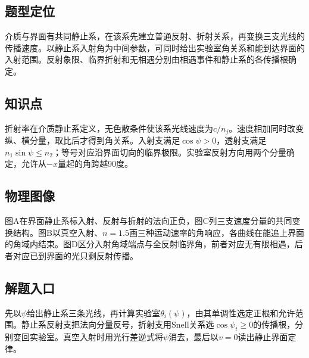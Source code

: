 \documentclass[UTF8,fontset=fandol,a4paper,11pt]{ctexart}
\begin{document}


\subsection*{题型定位}

介质与界面有共同静止系，在该系先建立普通反射、折射关系，再变换三支光线的传播速度。以静止系入射角为中间参数，可同时给出实验室角关系和能到达界面的入射范围。反射象限、临界折射和无相遇分别由相遇事件和静止系的各传播根确定。



\subsection*{知识点}

折射率在介质静止系定义，无色散条件使该系光线速度为$c/n_j$。速度相加同时改变纵、横分量，取比后才得到角关系。入射支满足$\cos\psi>0$，透射支满足$n_1\sin\psi\le n_2$；等号对应沿界面切向的临界极限。实验室反射方向用两个分量确定，允许从$-x$量起的角跨越90度。



\subsection*{物理图像}

图A在界面静止系标入射、反射与折射的法向正负，图C列三支速度分量的共同变换结构。图B以真空入射、$n=1.5$画三种运动速率的角响应，各曲线在能追上界面的角域内结束。图D区分入射角域端点与全反射临界角，前者对应无有限相遇，后者对应已到界面的光只剩反射传播。



\subsection*{解题入口}

先以$\psi$给出静止系三条光线，再计算实验室$\theta_i(\psi)$，由其单调性选定正根和允许范围。静止系反射支把法向分量反号，折射支用Snell关系选$\cos\psi_t\ge0$的传播根，分别变回实验室。真空入射时用光行差逆式将$\psi$消去，最后以$v=0$读出静止界面定律。

\end{document}
